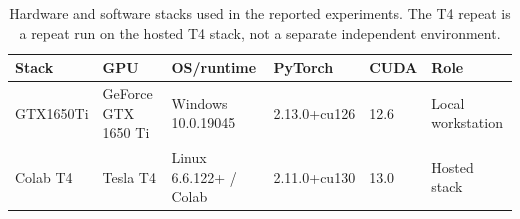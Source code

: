 \begin{table}[t]
\centering\fontsize{9}{11}\selectfont
\caption{Hardware and software stacks used in the reported experiments. The T4 repeat is a repeat run on the hosted T4 stack, not a separate independent environment.}
\label{tab:environment-stack-summary}
\setlength{\tabcolsep}{3pt}
\renewcommand{\arraystretch}{1.12}
\begin{tabularx}{\linewidth}{@{}>{\raggedright\arraybackslash}p{1.9cm}>{\raggedright\arraybackslash}p{3.4cm}>{\raggedright\arraybackslash}p{3.6cm}ll>{\raggedright\arraybackslash}X@{}}
\toprule
Stack & GPU & OS/runtime & PyTorch & CUDA & Role \\
\midrule
GTX1650Ti & GeForce GTX 1650 Ti & Windows 10.0.19045 & 2.13.0+cu126 & 12.6 & Local workstation \\
Colab T4 & Tesla T4 & Linux 6.6.122+ / Colab & 2.11.0+cu130 & 13.0 & Hosted stack \\
\bottomrule
\end{tabularx}
\end{table}
